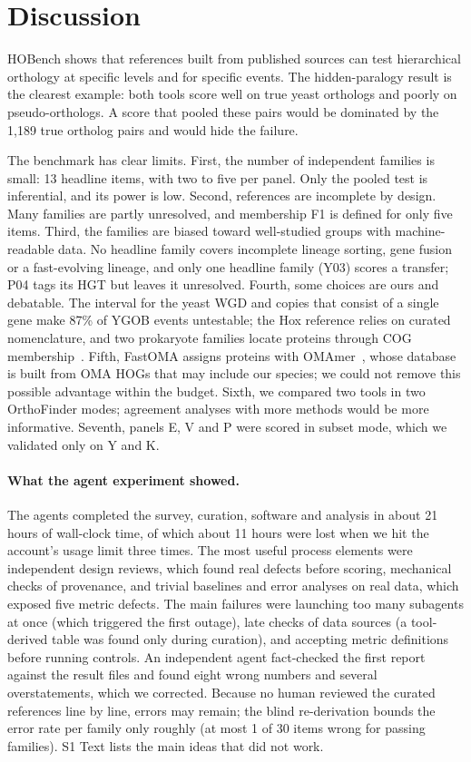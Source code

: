 \section*{Discussion}
HOBench shows that references built from published sources can test hierarchical orthology at specific levels and
for specific events. The hidden-paralogy result is the clearest example: both tools score well on true yeast
orthologs and poorly on pseudo-orthologs. A score that pooled these pairs would be dominated by the 1,189 true
ortholog pairs and would hide the failure.

The benchmark has clear limits. First, the number of independent families is small: 13 headline items, with two to
five per panel. Only the pooled test is inferential, and its power is low. Second, references are incomplete by
design. Many families are partly unresolved, and membership F1 is defined for only five items. Third, the families
are biased toward well-studied groups with machine-readable data. No headline family covers incomplete lineage sorting,
gene fusion or a fast-evolving lineage, and only one headline family (Y03) scores a transfer; P04 tags its HGT but leaves it
unresolved. Fourth, some choices are ours and debatable.
The interval for the yeast WGD and copies that consist of a single gene make 87\% of YGOB events untestable; the Hox reference relies on curated nomenclature,
and two prokaryote families locate proteins through COG membership~\cite{galperin2021cog}. Fifth, FastOMA assigns
proteins with OMAmer~\cite{rossier2021omamer}, whose database is built from OMA HOGs that may include our species; we
could not remove this possible advantage within the budget. Sixth, we compared two tools in two OrthoFinder modes;
agreement analyses with more methods would be more informative. Seventh, panels E, V and P were scored in subset mode,
which we validated only on Y and K.

\paragraph{What the agent experiment showed.} The agents completed the survey, curation, software and analysis in
about 21 hours of wall-clock time, of which about 11 hours were lost when we hit the account's usage limit three times. The most
useful process elements were independent design reviews, which found real defects before scoring, mechanical checks
of provenance, and trivial baselines and error analyses on real data, which exposed five metric defects. The main failures were
launching too many subagents at once (which triggered the first outage), late checks of data sources (a tool-derived
table was found only during curation), and accepting metric definitions before running controls. An independent
agent fact-checked the first report against the result files and found eight wrong numbers and several overstatements,
which we corrected. Because no human reviewed the curated references line by line, errors may remain; the blind
re-derivation bounds the error rate per family only roughly (at most 1 of 30 items wrong for passing families). S1 Text lists the main
ideas that did not work.

